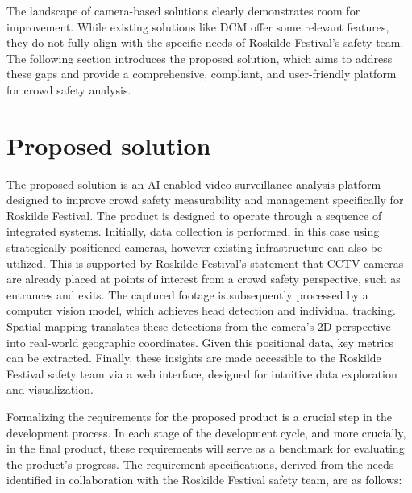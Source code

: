 The landscape of camera-based solutions clearly demonstrates room for improvement. While existing solutions like DCM offer some relevant features, they do not fully align with the specific needs of Roskilde Festival's safety team. The following section introduces the proposed solution, which aims to address these gaps and provide a comprehensive, compliant, and user-friendly platform for crowd safety analysis.

\section{Proposed solution}
\label{sec:solution}

The proposed solution is an AI-enabled video surveillance analysis platform designed to improve crowd safety measurability and management specifically for Roskilde Festival. The product is designed to operate through a sequence of integrated systems. Initially, data collection is performed, in this case using strategically positioned cameras, however existing infrastructure can also be utilized. This is supported by Roskilde Festival's statement that CCTV cameras are already placed at points of interest from a crowd safety perspective, such as entrances and exits. The captured footage is subsequently processed by a computer vision model, which achieves head detection and individual tracking. Spatial mapping translates these detections from the camera's 2D perspective into real-world geographic coordinates. Given this positional data, key metrics can be extracted. Finally, these insights are made accessible to the Roskilde Festival safety team via a web interface, designed for intuitive data exploration and visualization.

Formalizing the requirements for the proposed product is a crucial step in the development process. In each stage of the development cycle, and more crucially, in the final product, these requirements will serve as a benchmark for evaluating the product's progress. The requirement specifications, derived from the needs identified in collaboration with the Roskilde Festival safety team, are as follows:


